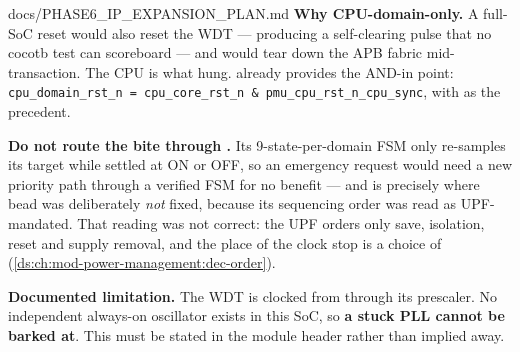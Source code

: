 \begin{relocated}{docs/PHASE6_IP_EXPANSION_PLAN.md}
\textbf{Why CPU-domain-only.} A full-SoC reset would also reset the WDT
--- producing a self-clearing pulse that no cocotb test can scoreboard
--- and would tear down the APB fabric mid-transaction. The CPU is what
hung.  already provides the AND-in point:
\texttt{cpu\_\allowbreak{}domain\_\allowbreak{}rst\_\allowbreak{}n\ =\allowbreak{}\ cpu\_\allowbreak{}core\_\allowbreak{}rst\_\allowbreak{}n\ \&\ pmu\_\allowbreak{}cpu\_\allowbreak{}rst\_\allowbreak{}n\_\allowbreak{}cpu\_\allowbreak{}sync},
with  as the  precedent.

\textbf{Do not route the bite through .} Its
9-state-per-domain FSM only re-samples its target while settled at ON or
OFF, so an emergency request would need a new priority path through a
verified FSM for no benefit --- and  is precisely where
bead  was deliberately \emph{not} fixed, because its
sequencing order was read as UPF-mandated. That reading was not correct:
the UPF orders only save, isolation, reset and supply removal, and the
place of the clock stop is a choice of 
(\cref{ds:ch:mod-power-management:dec-order}).

\warn{} \textbf{Documented limitation.} The WDT is clocked from
 through its prescaler. No independent always-on
oscillator exists in this SoC, so \textbf{a stuck PLL cannot be barked
at}. This must be stated in the module header rather than implied away.


\end{relocated}
